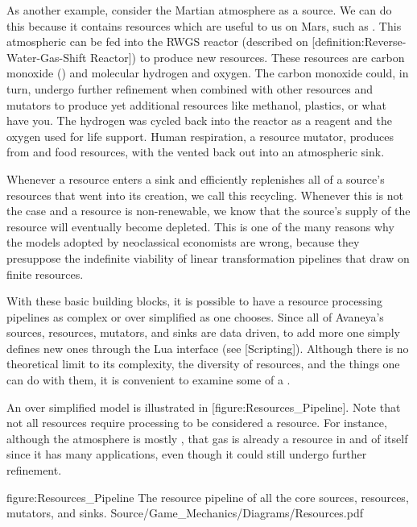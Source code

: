 As another example, consider the Martian atmosphere as a source. We can do this because it contains resources which are useful to us on Mars, such as . This atmospheric  can be fed into the RWGS reactor (described on [definition:Reverse-Water-Gas-Shift Reactor]) to produce new resources. These resources are carbon monoxide () and molecular hydrogen and oxygen. The carbon monoxide could, in turn, undergo further refinement when combined with other resources and mutators to produce yet additional resources like methanol, plastics, or what have you. The hydrogen was cycled back into the reactor as a reagent and the oxygen used for life support. Human respiration, a resource mutator, produces  from  and food resources, with the  vented back out into an atmospheric sink.

Whenever a resource enters a sink and efficiently replenishes all of a source's resources that went into its creation, we call this recycling. Whenever this is not the case and a resource is non-renewable, we know that the source's supply of the resource will eventually become depleted. This is one of the many reasons why the models adopted by neoclassical economists are wrong, because they presuppose the indefinite viability of linear transformation pipelines that draw on finite resources.

With these basic building blocks, it is possible to have a resource processing pipelines as complex or over simplified as one chooses. Since all of Avaneya's sources, resources, mutators, and sinks are data driven, to add more one simply defines new ones through the Lua interface (see [Scripting]). Although there is no theoretical limit to its complexity, the diversity of resources, and the things one can do with them, it is convenient to examine some of a .

An over simplified model is illustrated in [figure:Resources_Pipeline]. Note that not all resources require processing to be considered a resource. For instance, although the atmosphere is mostly , that gas is already a resource in and of itself since it has many applications, even though it could still undergo further refinement.

\FullPageDiagram
    {figure:Resources_Pipeline}
    {The resource pipeline of all the core sources, resources, mutators, and sinks.}
    {Source/Game_Mechanics/Diagrams/Resources.pdf}


